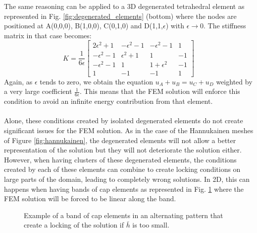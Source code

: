 \documentclass{article}
\begin{document}
The same reasoning can be applied to a 3D degenerated tetrahedral element as represented in Fig. \ref{fig:degenerated_elements} (bottom) where the nodes are positioned at A(0,0,0), B(1,0,0), C(0,1,0) and D(1,1,$\epsilon$) with $\epsilon \to 0$. The stiffness matrix in that case becomes:
\begin{equation*}
    K = \frac{1}{6\epsilon} \begin{bmatrix}
        2\epsilon^2 + 1 & -\epsilon^2 -1 & -\epsilon^2-1 & 1 \\
        -\epsilon^2 - 1 & \epsilon^2 + 1 & 1 & -1 \\
        -\epsilon^2 - 1 & 1 & 1 + \epsilon^2 & -1 \\
        1 & -1 & -1 & 1
    \end{bmatrix}
\end{equation*}
Again, as $\epsilon$ tends to zero, we obtain the equation $u_A + u_B = u_C + u_D$ weighted by a very large coefficient $\frac{1}{6\epsilon}$. This means that the FEM solution will enforce this condition to avoid an infinite energy contribution from that element. \\ \\
Alone, these conditions created by isolated degenerated elements do not create significant issues for the FEM solution. As in the case of the Hannukainen meshes of Figure \ref{fig:hannukainen}, the degenerated elements will not allow a better representation of the solution but they will not deteriorate the solution either. However, when having clusters of these degenerated elements, the conditions created by each of these elements can combine to create locking conditions on large parts of the domain, leading to completely wrong solutions. In 2D, this can happens when having bands of cap elements as represented in Fig. \ref{fig:2D_locking} where the FEM solution will be forced to be linear along the band. 
\begin{figure}[!ht]
\begin{center}
\end{center}
\caption{Example of a band of cap elements in an alternating pattern that create a locking of the solution if $\bar{h}$ is too small.} \label{fig:2D_locking}
\end{figure} \\
\end{document}
